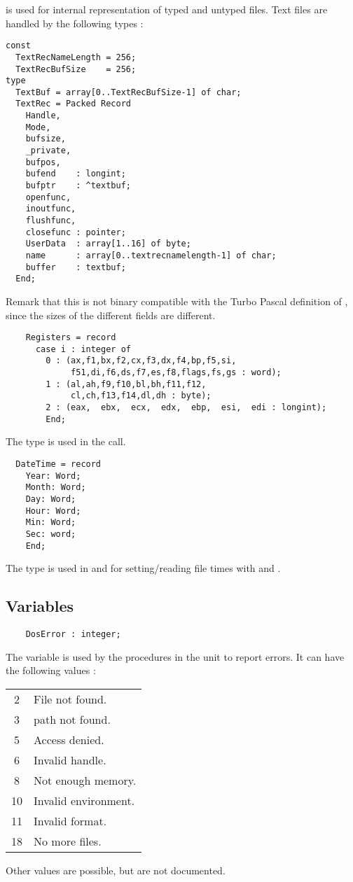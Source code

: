  is used for internal representation of typed and untyped files.
Text files are handled by the following types :
\begin{verbatim}
const
  TextRecNameLength = 256;
  TextRecBufSize    = 256;
type
  TextBuf = array[0..TextRecBufSize-1] of char;
  TextRec = Packed Record
    Handle,
    Mode,  
    bufsize,
    _private,
    bufpos,  
    bufend    : longint;
    bufptr    : ^textbuf;
    openfunc,
    inoutfunc,
    flushfunc,
    closefunc : pointer;
    UserData  : array[1..16] of byte;
    name      : array[0..textrecnamelength-1] of char;
    buffer    : textbuf;
  End;
\end{verbatim}
Remark that this is not binary compatible with the Turbo Pascal definition
of , since the sizes of the different fields are different.
\begin{verbatim}
    Registers = record
      case i : integer of
        0 : (ax,f1,bx,f2,cx,f3,dx,f4,bp,f5,si,
             f51,di,f6,ds,f7,es,f8,flags,fs,gs : word);
        1 : (al,ah,f9,f10,bl,bh,f11,f12,
             cl,ch,f13,f14,dl,dh : byte);
        2 : (eax,  ebx,  ecx,  edx,  ebp,  esi,  edi : longint);
        End;
\end{verbatim}
The   type is used in the  call.
\begin{verbatim}
  DateTime = record
    Year: Word;
    Month: Word;
    Day: Word;
    Hour: Word;
    Min: Word;
    Sec: word;
    End;
\end{verbatim}
The  type is used in  and  for
setting/reading file times with  and .
\subsection{Variables}
\begin{verbatim}
    DosError : integer;
\end{verbatim}
The  variable is used by the procedures in the \dos unit to 
report errors. It can have the following values :
\begin{center}
\begin{tabular}{cl}
2 & File not found. \\
3 & path not found. \\
5 & Access denied. \\
6 & Invalid handle. \\
8 & Not enough memory. \\
10 & Invalid environment. \\
11 & Invalid format. \\
18 & No more files.
\end{tabular}
\end{center}
Other values are possible, but are not documented.

